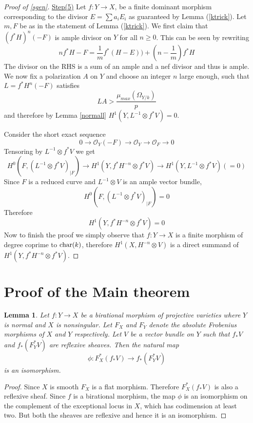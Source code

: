 \documentclass[12pt,oneside]{amsart}
\theoremstyle{plain}
\newtheorem{lem}[thm]{Lemma}
\theoremstyle{definition}
\newcommand{\tensor}{\otimes}
\newcommand{\Char}{{\rm char}}
\newcommand{\sO}{{\mathcal O}}
\begin{document}
\begin{proof}[Proof of \eqref{sgen}]
\noindent \underline{Step(5)} Let $f:Y\to X$, be a finite dominant morphism corresponding to the divisor $E=\sum a_iE_i$ as guaranteed by Lemma (\ref{ktrick}). Let $m,F$ be as in the statement of Lemma (\ref{ktrick}). We first claim that $(f^*H)^n(-F)$ is ample divisor on $Y$ for all $n\geq 0$. This can be seen by rewriting
$$ nf^*H - F = \frac{1}{m}f^*(H-E)) + (n-\frac{1}{m})f^*H$$
The divisor on the RHS is a sum of an ample and a nef divisor and thus is ample. \\

\noindent We now fix a polarization $A$ on $Y$ and choose an integer $n$ large enough, such that $L=f^*H^n(-F)$ satisfies
$$ LA > \frac{\mu_{max}(\Omega_{Y/k})}{p}$$
and therefore by Lemma \ref{normall} $H^1(Y, L^{-1}\tensor f^*V)=0$. 

\noindent Consider the short exact sequence $$ 0 \to \sO_Y(-F) \to \sO_Y \to \sO_F \to 0$$ Tensoring by $L^{-1}\tensor f^*V$ we get 
$$ H^0(F, \left(L^{-1}\tensor f^*V\right)_{|F}) \to H^1(Y, f^*H^{-n} \tensor f^*V) \to H^1(Y, L^{-1}\tensor f^*V)(=0)$$
Since $F$ is a reduced curve and $L^{-1}\tensor V$ is an ample vector bundle, $$H^0(F,\left(L^{-1}\tensor f^*V\right)_{|F})=0$$ Therefore 
$$H^1(Y, f^*H^{-n} \tensor f^*V)=0$$ Now to finish the proof we simply observe that $f:Y\to X$ is a finite morphism of degree coprime to $\Char(k)$, therefore $H^1(X,H^{-n}\tensor V)$ is a direct summand of $H^1(Y, f^*H^{-n} \tensor f^*V)$.
\end{proof}

\section{Proof of the Main theorem}


\begin{lem}\label{fpullback}
Let $f:Y\to X$ be a birational morphism of projective varieties where $Y$ is normal and $X$ is nonsingular. Let $F_X$ and $F_Y$ denote the absolute Frobenius morphisms of $X$ and $Y$ respectively. Let $V$ be a vector bundle on $Y$ such that $f_*V$ and $f_*(F_Y^*V)$ are reflexive sheaves. Then the natural map 
$$ \phi: F_X^*(f_*V) \to f_*(F_Y^*V)$$
is an isomorphism.
\end{lem}
\begin{proof}
Since $X$ is smooth $F_X$ is a flat morphism. Therefore $F_X^*(f_*V)$ is also a reflexive sheaf. Since $f$ is a birational morphism, the map $\phi$ is an isomorphism on the complement of the exceptional locus in $X$, which has codimension at least two. But both the sheaves are reflexive and hence it is an isomorphism. 
\end{proof}
\end{document}
